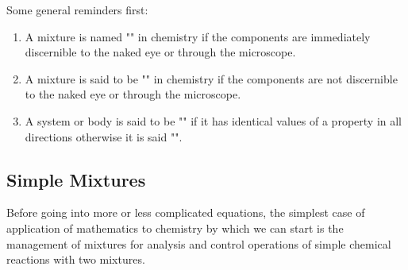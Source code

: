 	Some general reminders first:
	\begin{enumerate}
		\item A mixture is named "" in chemistry if the components are immediately discernible to the naked eye or through the microscope.
		
		\item A mixture is said to be "" in chemistry if the components are not discernible to the naked eye or through the microscope.
		
		\item A system or body is said to be "" if it has identical values of a property in all directions otherwise it is said "".
	\end{enumerate}
	
	\subsection{Simple Mixtures}
	Before going into more or less complicated equations, the simplest case of application of mathematics to chemistry by which we can start is the management of mixtures for analysis and control operations of simple chemical reactions with two mixtures.
	
